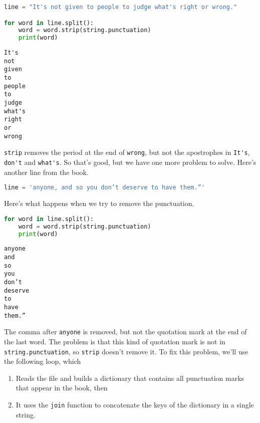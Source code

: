 \begin{lstlisting}[language=Python,style=source]
line = "It's not given to people to judge what's right or wrong."

for word in line.split():
    word = word.strip(string.punctuation)
    print(word)
\end{lstlisting}

\begin{lstlisting}[style=output]
It's
not
given
to
people
to
judge
what's
right
or
wrong
\end{lstlisting}

\passthrough{\lstinline!strip!} removes the period at the end of
\passthrough{\lstinline!wrong!}, but not the apostrophes in
\passthrough{\lstinline!It's!}, \passthrough{\lstinline!don't!} and
\passthrough{\lstinline!what's!}. So that's good, but we have one more
problem to solve. Here's another line from the book.

\begin{lstlisting}[language=Python,style=source]
line = 'anyone, and so you don’t deserve to have them.”'
\end{lstlisting}

Here's what happens when we try to remove the punctuation.

\begin{lstlisting}[language=Python,style=source]
for word in line.split():
    word = word.strip(string.punctuation)
    print(word)
\end{lstlisting}

\begin{lstlisting}[style=output]
anyone
and
so
you
don’t
deserve
to
have
them.”
\end{lstlisting}

The comma after \passthrough{\lstinline!anyone!} is removed, but not the
quotation mark at the end of the last word. The problem is that this
kind of quotation mark is not in
\passthrough{\lstinline!string.punctuation!}, so
\passthrough{\lstinline!strip!} doesn't remove it. To fix this problem,
we'll use the following loop, which

\begin{enumerate}
\def\labelenumi{\arabic{enumi}.}
\item
  Reads the file and builds a dictionary that contains all punctuation
  marks that appear in the book, then
\item
  It uses the \passthrough{\lstinline!join!} function to concatenate the
  keys of the dictionary in a single string.
\end{enumerate}

